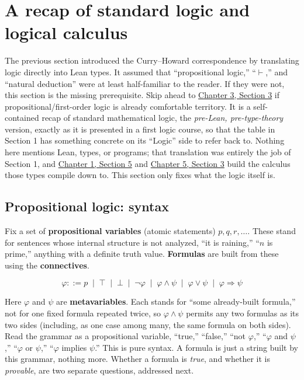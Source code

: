 \section{A recap of standard logic and logical calculus}\label{sec:03-propositions-and-proofs:02-logic-recap:1}

The previous section introduced the Curry--Howard correspondence by translating logic directly into Lean types. It assumed that ``propositional logic,'' ``\(\vdash\),'' and ``natural deduction'' were at least half-familiar to the reader. If they were not, this section is the missing prerequisite. Skip ahead to \hyperref[sec:03-propositions-and-proofs:03-theorem-lemma:1]{Chapter 3, Section 3} if propositional/first-order logic is already comfortable territory. It is a self-contained recap of standard mathematical logic, the \emph{pre-Lean, pre-type-theory} version, exactly as it is presented in a first logic course, so that the table in Section 1 has something concrete on its ``Logic'' side to refer back to. Nothing here mentions Lean, types, or programs; that translation was entirely the job of Section 1, and \hyperref[sec:01-basics:05-pi-sigma-and-coc:1]{Chapter 1, Section 5} and \hyperref[sec:05-rigor-check:03-typing-rules-and-safety:1]{Chapter 5, Section 3} build the calculus those types compile down to. This section only fixes what the logic itself is.

\subsection{Propositional logic: syntax}\label{sec:03-propositions-and-proofs:02-logic-recap:2}

Fix a set of \textbf{propositional variables} (atomic statements) \(p, q, r, \dots\). These stand for sentences whose internal structure is not analyzed, ``it is raining,'' ``\(n\) is prime,'' anything with a definite truth value. \textbf{Formulas} are built from these using the \textbf{connectives}.

\[
\varphi ::= p \;\mid\; \top \;\mid\; \bot \;\mid\; \neg\varphi \;\mid\;
\varphi \wedge \psi \;\mid\; \varphi \vee \psi \;\mid\;
\varphi \Rightarrow \psi
\]

Here \(\varphi\) and \(\psi\) are \textbf{metavariables}. Each stands for ``some already-built formula,'' not for one fixed formula repeated twice, so \(\varphi \wedge \psi\) permits any two formulas as its two sides (including, as one case among many, the same formula on both sides). Read the grammar as a propositional variable, ``true,'' ``false,'' ``not \(\varphi\),'' ``\(\varphi\) and \(\psi\),'' ``\(\varphi\) or \(\psi\),'' ``\(\varphi\) implies \(\psi\).'' This is pure syntax. A formula is just a string built by this grammar, nothing more. Whether a formula is \emph{true}, and whether it is \emph{provable}, are two separate questions, addressed next.

